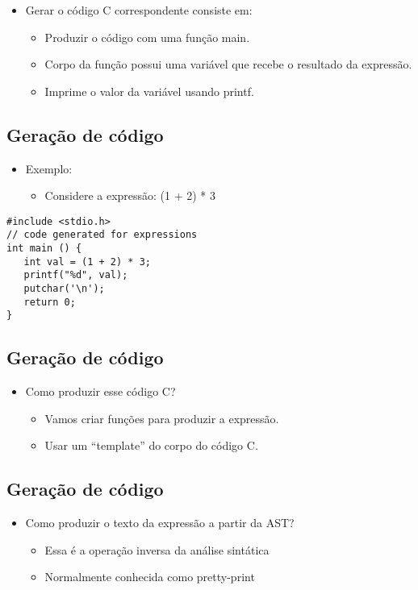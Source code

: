 \documentclass[11pt]{article}
\begin{document}
\begin{itemize}
\item Gerar o código C correspondente consiste em:
\begin{itemize}
\item Produzir o código com uma função main.
\item Corpo da função possui uma variável que recebe o resultado da expressão.
\item Imprime o valor da variável usando printf.
\end{itemize}
\end{itemize}
\subsection*{Geração de código}
\label{sec:org58cedb0}

\begin{itemize}
\item Exemplo:
\begin{itemize}
\item Considere a expressão: (1 + 2) * 3
\end{itemize}
\end{itemize}

\begin{verbatim}
#include <stdio.h>
// code generated for expressions
int main () {
   int val = (1 + 2) * 3;
   printf("%d", val);
   putchar('\n');
   return 0;
}
\end{verbatim}
\subsection*{Geração de código}
\label{sec:orge6ad2e4}

\begin{itemize}
\item Como produzir esse código C?
\begin{itemize}
\item Vamos criar funções para produzir a expressão.
\item Usar um ``template'' do corpo do código C.
\end{itemize}
\end{itemize}
\subsection*{Geração de código}
\label{sec:orgfe3532a}

\begin{itemize}
\item Como produzir o texto da expressão a partir da AST?
\begin{itemize}
\item Essa é a operação inversa da análise sintática
\item Normalmente conhecida como pretty-print
\end{itemize}
\end{itemize}
\end{document}
